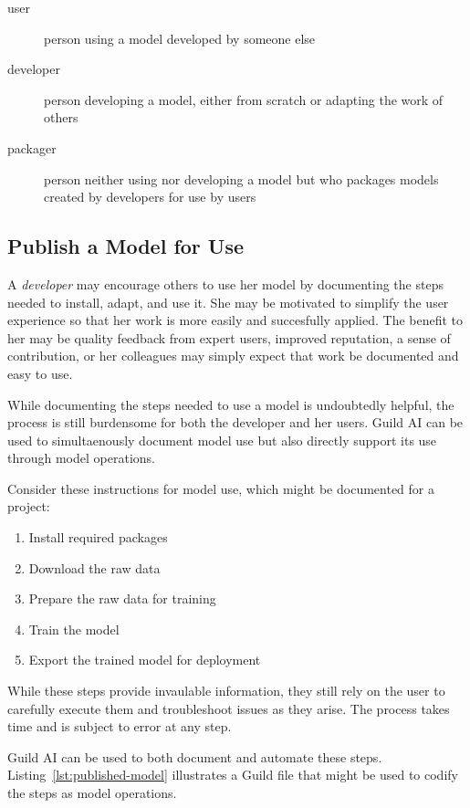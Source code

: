 \documentclass{article}
\begin{document}
\begin{description}
    \item[user] person using a model developed by someone else
    \item[developer] person developing a model, either from scratch or
      adapting the work of others
    \item[packager] person neither using nor developing a model but
      who packages models created by developers for use by users
\end{description}

\subsection{Publish a Model for Use}
\label{sec:publish-model}

A \emph{developer} may encourage others to use her model by
documenting the steps needed to install, adapt, and use it. She may be
motivated to simplify the user experience so that her work is more
easily and succesfully applied. The benefit to her may be quality
feedback from expert users, improved reputation, a sense of
contribution, or her colleagues may simply expect that work be
documented and easy to use.

While documenting the steps needed to use a model is undoubtedly
helpful, the process is still burdensome for both the developer and
her users. Guild AI can be used to simultaenously document model use
but also directly support its use through model operations.

Consider these instructions for model use, which might be documented
for a project:

\begin{enumerate}
   \item Install required packages
   \item Download the raw data
   \item Prepare the raw data for training
   \item Train the model
   \item Export the trained model for deployment
\end{enumerate}

While these steps provide invaulable information, they still rely on
the user to carefully execute them and troubleshoot issues as they
arise. The process takes time and is subject to error at any step.

Guild AI can be used to both document and automate these
steps. Listing~\ref{lst:published-model} illustrates a Guild file that
might be used to codify the steps as model operations.
\end{document}
